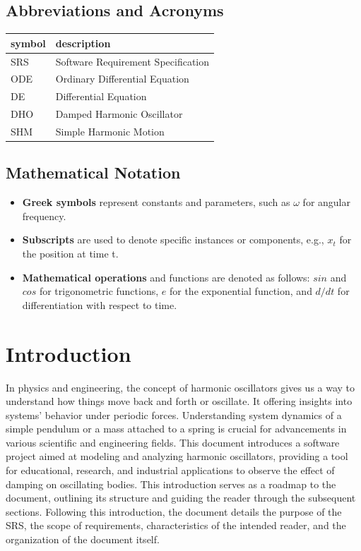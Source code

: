 \documentclass[12pt]{article}
\begin{document}
\newpage

\subsection{Abbreviations and Acronyms}

\renewcommand{\arraystretch}{1.2} 
\begin{longtable*}{l l}
  \toprule		
  \textbf{symbol} & \textbf{description}\\
  \midrule 
  SRS & Software Requirement Specification\\
  ODE & Ordinary Differential Equation\\
  DE & Differential Equation\\
  DHO & Damped Harmonic Oscillator\\
  SHM & Simple Harmonic Motion\\
  \bottomrule
\end{longtable*}

\subsection{Mathematical Notation}

\begin{itemize}
  \item \textbf{Greek symbols} represent constants and parameters, such as $\omega$ for angular frequency.
  \item \textbf{Subscripts} are used to denote specific instances or components, e.g., $x_{t}$ for the position at time t.
  \item \textbf{Mathematical operations} and functions are denoted as follows: $sin$ and $cos$ for trigonometric functions, $e$ for the exponential function, and $d/dt$ for differentiation with respect to time.
\end{itemize}

\newpage

\section{Introduction}

In physics and engineering, the concept of harmonic oscillators gives 
us a way to understand how things move back and forth or oscillate. It 
offering insights into systems' behavior under periodic forces. 
Understanding system dynamics of a simple pendulum or a mass attached 
to a spring is crucial for advancements in various scientific and 
engineering fields. This document introduces a software project aimed 
at modeling and analyzing harmonic oscillators, providing a tool for 
educational, research, and industrial applications to observe the effect 
of damping on oscillating bodies.
\newline
\newline
This introduction serves as a roadmap to the document, outlining its 
structure and guiding the reader through the subsequent sections. 
Following this introduction, the document details the purpose of the 
SRS, the scope of requirements, characteristics of the intended reader, 
and the organization of the document itself.
\end{document}
